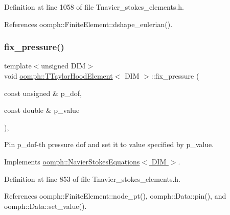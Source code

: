 Definition at line 1058 of file Tnavier\+\_\+stokes\+\_\+elements.\+h.



References oomph\+::\+Finite\+Element\+::dshape\+\_\+eulerian().

\mbox{\label{classoomph_1_1TTaylorHoodElement_af20b4527dcb0206523f22d0dd4825727}} 
\subsubsection{\texorpdfstring{fix\+\_\+pressure()}{fix\_pressure()}}
{\footnotesize\ttfamily template$<$unsigned D\+IM$>$ \\
void \hyperlink{classoomph_1_1TTaylorHoodElement}{oomph\+::\+T\+Taylor\+Hood\+Element}$<$ D\+IM $>$\+::fix\+\_\+pressure (\begin{DoxyParamCaption}\item[{const unsigned \&}]{p\+\_\+dof,  }\item[{const double \&}]{p\+\_\+value }\end{DoxyParamCaption})\hspace{0.3cm}{\ttfamily [inline]}, {\ttfamily [virtual]}}



Pin p\+\_\+dof-\/th pressure dof and set it to value specified by p\+\_\+value. 



Implements \hyperlink{classoomph_1_1NavierStokesEquations_aa33a3dd5c1cdba0a044e40ad290e487c}{oomph\+::\+Navier\+Stokes\+Equations$<$ D\+I\+M $>$}.



Definition at line 853 of file Tnavier\+\_\+stokes\+\_\+elements.\+h.



References oomph\+::\+Finite\+Element\+::node\+\_\+pt(), oomph\+::\+Data\+::pin(), and oomph\+::\+Data\+::set\+\_\+value().

\mbox{\label{classoomph_1_1TTaylorHoodElement_ab575a23e0341900bcd8b02732319a45d}} 
